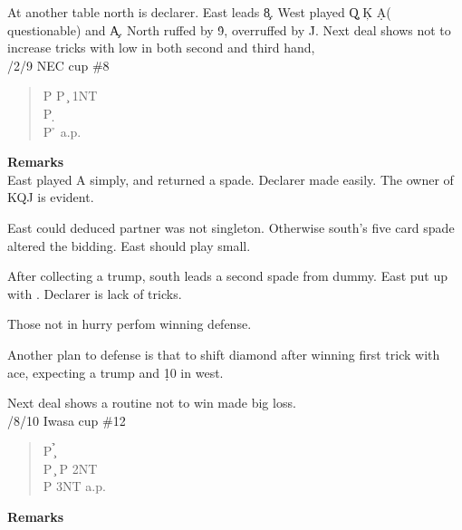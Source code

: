 At another table  north is declarer. East leads \c 8.
West played \c Q \c K  \d A( questionable) and \c A.
North ruffed by \h 9, overruffed by \h J. 
\vspace{0.5cm}
Next deal shows not to increase tricks with low in both second and third
hand,\\
/2/9 NEC cup  \#8
\begin{quote}
%
  {}%
  {}
  {}%
  {}%
\end{quote}
\begin{quote}
\begin{bidding}
P \> P  \c  \> 1NT \\
P \d {}\s {}\h \\
P \h \> a.p.
\end{bidding}
\end{quote}
{\bf Remarks}\\

East played \s A simply, and returned a spade.
Declarer made easily. The owner of \s KQJ is evident.

East could deduced partner was not 
singleton. Otherwise south's five card spade altered the
bidding. East should play small.

After collecting a trump, south leads a  second spade from dummy. 
East put up with . Declarer is lack of tricks.

Those not in hurry perfom winning defense.

Another plan to defense is that to shift diamond after
winning first trick with ace, expecting a trump and \d 10 in west.


\vspace{0.5cm}
Next deal shows a routine not to win made big loss.\\
/8/10 Iwasa cup  \#12
\begin{quote}
%
  {}%
  {}
  {}%
  {}%
\end{quote}
\begin{quote}
\begin{bidding}
P \c  {}\h  {}\s \\
P \c \> P \> 2NT \\
P \> 3NT \> a.p.
\end{bidding}
\end{quote}
{\bf Remarks}\\


